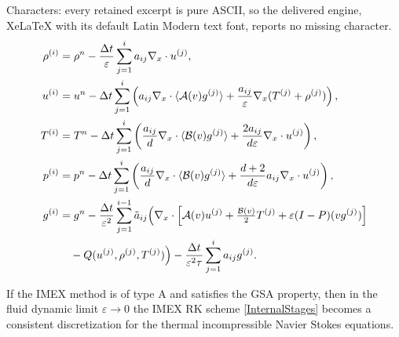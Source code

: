 \documentclass[10pt,a4paper]{amsart}
\begin{document}
Characters: every retained excerpt is pure ASCII, so the delivered engine, XeLaTeX with its default Latin Modern text font, reports no missing character.
\begin{align}
\label{InternalStages}
\rho^{(i)} &= \rho^n - \frac{\Delta t}{\varepsilon} \sum_{j = 1}^i a_{ij} \nabla_x \cdot u^{(j)}, \nonumber \\
u^{(i)} &= u^n - \Delta t  \sum_{j = 1}^i \left( a_{ij} \nabla_x \cdot \langle \mathcal{A}(v) g^{(j)} \rangle  + \frac{a_{ij}}{\varepsilon} \nabla_x (T^{(j)} + \rho^{(j)})\right), \nonumber \\
T^{(i)} &= T^n - \Delta t  \sum_{j = 1}^i \left( \frac{a_{ij}}{d} \nabla_x \cdot \langle \mathcal{B}(v) g^{(j)} \rangle  + \frac{2 a_{ij}}{d \varepsilon} \nabla_x \cdot u^{(j)}\right), \nonumber \\
p^{(i)} &= p^n - \Delta t  \sum_{j = 1}^i \left( \frac{a_{ij}}{d} \nabla_x \cdot \langle \mathcal{B}(v) g^{(j)} \rangle  + \frac{d+2}{d \varepsilon} a_{ij} \nabla_x \cdot u^{(j)}\right), \\
g^{(i)} &= g^n - \frac{\Delta t}{\varepsilon^2} \sum_{j=1}^{i-1} \tilde{a}_{ij} \Bigl( \nabla_x \cdot \left[ \mathcal{A}(v)u^{(j)} + \tfrac{\mathcal{B}(v)}{2}T^{(j)} + \varepsilon (I-P) (vg^{(j)})\right] \nonumber \\
&\quad - Q(u^{(j)},\rho^{(j)},T^{(j)}) \Bigr) - \frac{\Delta t}{\varepsilon^2 \tau} \sum_{j=1}^i a_{ij} g^{(j)}. \nonumber
\end{align}

\begin{theorem}\label{ThmFullBGKTypeA}
	If the IMEX method is of type A and satisfies the GSA property, then in the fluid dynamic limit $\varepsilon \rightarrow 0$ the IMEX RK scheme \eqref{InternalStages} becomes a consistent discretization for the thermal  incompressible Navier Stokes equations.
\end{theorem}
\end{document}
